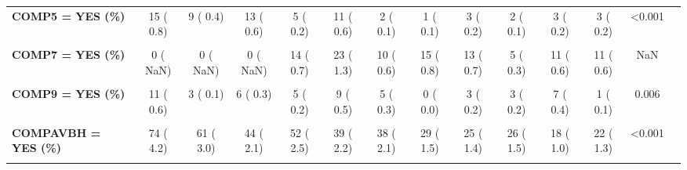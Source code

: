 \documentclass[
]{article}
\begin{document}
\begin{table}[H]
\begin{tabular}[t]{>{\raggedright\arraybackslash}p{5em}ccccccccccccc}
\textbf{COMP5 = YES (\%)} & 15 (  0.8) & 9 (  0.4) & 13 (  0.6) & 5 (  0.2) & 11 (  0.6) & 2 (  0.1) & 1 (  0.1) & 3 (  0.2) & 2 (  0.1) & 3 (  0.2) & 3 (  0.2) & <0.001 & \\
\textbf{\cellcolor{gray!10}{COMP6 = YES (\%)}} & \cellcolor{gray!10}{32 (  1.8)} & \cellcolor{gray!10}{28 (  1.4)} & \cellcolor{gray!10}{8 (  0.4)} & \cellcolor{gray!10}{0 (  NaN)} & \cellcolor{gray!10}{0 (  NaN)} & \cellcolor{gray!10}{0 (  NaN)} & \cellcolor{gray!10}{0 (  NaN)} & \cellcolor{gray!10}{0 (  NaN)} & \cellcolor{gray!10}{0 (  NaN)} & \cellcolor{gray!10}{0 (  NaN)} & \cellcolor{gray!10}{0 (  NaN)} & \cellcolor{gray!10}{NaN} & \cellcolor{gray!10}{}\\
\textbf{COMP7 = YES (\%)} & 0 (  NaN) & 0 (  NaN) & 0 (  NaN) & 14 (  0.7) & 23 (  1.3) & 10 (  0.6) & 15 (  0.8) & 13 (  0.7) & 5 (  0.3) & 11 (  0.6) & 11 (  0.6) & NaN & \\
\textbf{\cellcolor{gray!10}{COMP8 = YES (\%)}} & \cellcolor{gray!10}{18 (  1.0)} & \cellcolor{gray!10}{19 (  0.9)} & \cellcolor{gray!10}{13 (  0.6)} & \cellcolor{gray!10}{17 (  0.8)} & \cellcolor{gray!10}{8 (  0.5)} & \cellcolor{gray!10}{6 (  0.3)} & \cellcolor{gray!10}{9 (  0.5)} & \cellcolor{gray!10}{9 (  0.5)} & \cellcolor{gray!10}{9 (  0.5)} & \cellcolor{gray!10}{12 (  0.7)} & \cellcolor{gray!10}{12 (  0.7)} & \cellcolor{gray!10}{0.222} & \cellcolor{gray!10}{}\\
\textbf{COMP9 = YES (\%)} & 11 (  0.6) & 3 (  0.1) & 6 (  0.3) & 5 (  0.2) & 9 (  0.5) & 5 (  0.3) & 0 (  0.0) & 3 (  0.2) & 3 (  0.2) & 7 (  0.4) & 1 (  0.1) & 0.006 & \\
\textbf{\cellcolor{gray!10}{COMPAF = YES (\%)}} & \cellcolor{gray!10}{134 (  7.6)} & \cellcolor{gray!10}{132 (  6.4)} & \cellcolor{gray!10}{103 (  4.9)} & \cellcolor{gray!10}{132 (  6.4)} & \cellcolor{gray!10}{94 (  5.4)} & \cellcolor{gray!10}{90 (  5.1)} & \cellcolor{gray!10}{78 (  4.1)} & \cellcolor{gray!10}{66 (  3.7)} & \cellcolor{gray!10}{75 (  4.2)} & \cellcolor{gray!10}{66 (  3.8)} & \cellcolor{gray!10}{58 (  3.4)} & \cellcolor{gray!10}{<0.001} & \cellcolor{gray!10}{}\\
\textbf{COMPAVBH = YES (\%)} & 74 (  4.2) & 61 (  3.0) & 44 (  2.1) & 52 (  2.5) & 39 (  2.2) & 38 (  2.1) & 29 (  1.5) & 25 (  1.4) & 26 (  1.5) & 18 (  1.0) & 22 (  1.3) & <0.001 & \\
\textbf{\cellcolor{gray!10}{COMPBLTR = YES (\%)}} & \cellcolor{gray!10}{0 (  NaN)} & \cellcolor{gray!10}{0 (  NaN)} & \cellcolor{gray!10}{0 (  NaN)} & \cellcolor{gray!10}{0 (  NaN)} & \cellcolor{gray!10}{24 ( 36.4)} & \cellcolor{gray!10}{28 ( 54.9)} & \cellcolor{gray!10}{52 (  2.8)} & \cellcolor{gray!10}{29 (  1.6)} & \cellcolor{gray!10}{39 (  2.2)} & \cellcolor{gray!10}{26 ( 66.7)} & \cellcolor{gray!10}{6 ( 54.5)} & \cellcolor{gray!10}{NaN} & \cellcolor{gray!10}{}\\

\end{tabular}
\end{table}
\end{document}
